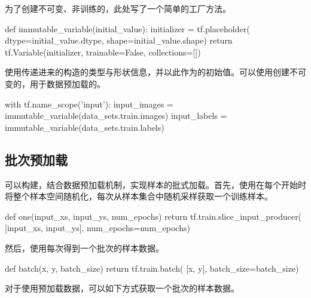 \begin{content}
为了创建不可变、非训练的，此处写了一个简单的工厂方法。

\begin{leftbar}
\begin{python}
def immutable_variable(initial_value):
  initializer = tf.placeholder(
    dtype=initial_value.dtype,
    shape=initial_value.shape)
  return tf.Variable(initializer, trainable=False, collections=[])
\end{python}
\end{leftbar}

使用传递进来的构造的类型与形状信息，并以此作为的初始值。可以使用创建不可变的，用于数据预加载的。

\begin{leftbar}
\begin{python}
with tf.name_scope('input'):
  input_images = immutable_variable(data_sets.train.images)
  input_labels = immutable_variable(data_sets.train.labels)
\end{python}
\end{leftbar}

\subsection{批次预加载}

可以构建，结合数据预加载机制，实现样本的批式加载。首先，使用在每个开始时将整个样本空间随机化，每次从样本集合中随机采样获取一个训练样本。

\begin{leftbar}
\begin{python}
def one(input_xs, input_ys, num_epochs)
  return tf.train.slice_input_producer(
    [input_xs, input_ys], num_epochs=num_epochs)
\end{python}
\end{leftbar}

然后，使用每次得到一个批次的样本数据。

\begin{leftbar}
\begin{python}
def batch(x, y, batch_size)
  return tf.train.batch(
    [x, y], batch_size=batch_size)
\end{python}
\end{leftbar}

对于使用预加载数据，可以如下方式获取一个批次的样本数据。


\end{content}

